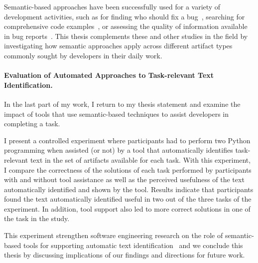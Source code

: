 Semantic-based approaches have been successfully used for a variety of development activities, such as
for finding who should fix a bug~\cite{yang2016}, searching for comprehensive code examples~\cite{silva2019},
or assessing the quality of information available in bug reports~\cite{chaparro2019}.
This thesis complements these and other studies in the field
by investigating how semantic approaches apply across different artifact types
commonly sought by developers in their daily work.




\paragraph{\textbf{Evaluation of Automated Approaches to Task-relevant Text Identification.}} 




In the last part of my work, I return to my thesis statement
and examine the impact of tools that use semantic-based techniques to assist developers in 
completing a task. 



I present a controlled experiment where participants had to 
perform two Python programming when assisted (or not) by a tool that automatically identifies task-relevant text 
in the set of artifacts available for each task. 
With this experiment, I compare the correctness of the solutions of each task 
performed by participants with and without tool assistance
as well as the perceived usefulness of the text automatically identified and shown by the tool. 
Results indicate that participants found the text automatically identified
useful in two out of the three tasks of the experiment.
In addition, tool support also led to more correct solutions 
in one of the task in the study.





This experiment strengthen software engineering research on the 
role of semantic-based tools for supporting
automatic text identification~\cite{nadi2020, Xu2017,Lotufo2012}
and we conclude this thesis by discussing implications of our findings and 
directions for future work.





